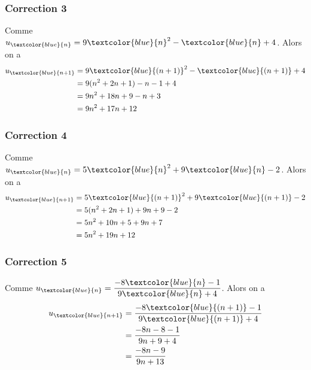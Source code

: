 \documentclass[15pt, mathserif]{beamer}
\begin{document}
\begin{frame}
\vspace{-10mm}
	\frametitle{Correction 3}
Comme $u_{\textcolor{blue}{n}}=9{\textcolor{blue}{n}}^2-{\textcolor{blue}{n}}+4$. Alors on a \begin{align*} 
 u_{{\textcolor{blue}{n+1}}} &=9{\textcolor{blue}{(n+1)}}^2-{\textcolor{blue}{(n+1)}}+4 \\ 
 &= 9(n^2+2n+1)-n-1+4 \\ 
 &= 9n^2 +18n +9-n+3\\ 
 &= 9n^2 +17n +12
 \end{align*}\end{frame}


\begin{frame}
\vspace{-10mm}
	\frametitle{Correction 4}
Comme $u_{\textcolor{blue}{n}}=5{\textcolor{blue}{n}}^2+9{\textcolor{blue}{n}}-2$. Alors on a \begin{align*} 
 u_{{\textcolor{blue}{n+1}}} &=5{\textcolor{blue}{(n+1)}}^2+9{\textcolor{blue}{(n+1)}}-2 \\ 
 &= 5(n^2+2n+1)+9n+9-2 \\ 
 &= 5n^2 +10n +5+9n+7\\ 
 &= 5n^2 +19n +12
 \end{align*}\end{frame}


\begin{frame}
\vspace{-10mm}
	\frametitle{Correction 5}
Comme $u_{\textcolor{blue}{n}}=\dfrac{-8\textcolor{blue}{n}-1}{9\textcolor{blue}{n}+4}$. Alors on a \begin{align*} 
 u_{\textcolor{blue}{n+1}} &=\dfrac{-8\textcolor{blue}{(n+1)}-1}{9\textcolor{blue}{(n+1)}+4} \\ 
 &= \dfrac{-8n-8-1}{9n+9+4} \\ 
 &= \dfrac{-8n-9}{9n+13}
 \end{align*}\end{frame}
\end{document}

